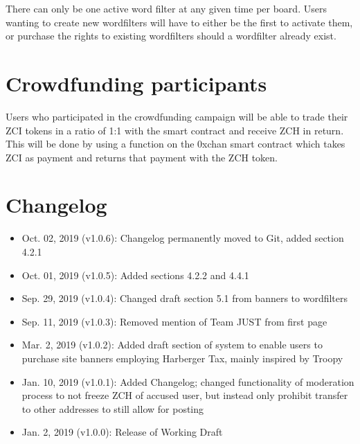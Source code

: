 \documentclass[a4paper]{article}
\newcommand{\projectname}{0xchan}
\begin{document}
There can only be one active word filter at any given time per board. Users wanting to create new wordfilters will have to either be the first to activate them, or purchase the rights to existing wordfilters should a wordfilter already exist.

\section{Crowdfunding participants}
Users who participated in the crowdfunding campaign will be able to trade their ZCI tokens in a ratio of 1:1 with the smart contract and receive ZCH in return. This will be done by using a function on the \projectname{} smart contract which takes ZCI as payment and returns that payment with the ZCH token.

\pagebreak
\section*{Changelog}
\begin{itemize}
\item Oct. 02, 2019 (v1.0.6): Changelog permanently moved to Git, added section 4.2.1 
\item Oct. 01, 2019 (v1.0.5): Added sections 4.2.2 and 4.4.1
\item Sep. 29, 2019 (v1.0.4): Changed draft section 5.1 from banners to wordfilters
\item Sep. 11, 2019 (v1.0.3): Removed mention of Team JUST from first page
\item Mar. 2, 2019 (v1.0.2): Added draft section of system to enable users to purchase site banners employing Harberger Tax, mainly inspired by Troopy
\item Jan. 10, 2019 (v1.0.1): Added Changelog; changed functionality of moderation process to not freeze ZCH of accused user, but instead only prohibit transfer to other addresses to still allow for posting
\item Jan. 2, 2019 (v1.0.0): Release of Working Draft
\end{itemize}
\end{document}
